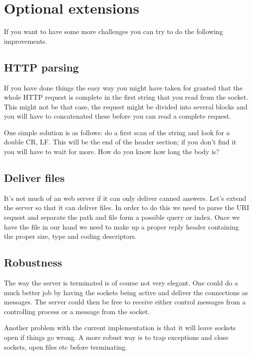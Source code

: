 \documentclass[a4paper,11pt]{article}
\begin{document}
\section{Optional extensions}

If you want to have some more challenges you can try to do the
following improvements.

\subsection{HTTP parsing}

If you have done things the easy way you might have taken for granted
that the whole HTTP request is complete in the first string that you
read from the socket. This might not be that case, the request might be
divided into several blocks and you will have to concatenated these
before you can read a complete request. 

One simple solution is as follows: do a first scan of the string and
look for a double CR, LF. This will be the end of the header section;
if you don't find it you will have to wait for more. How do you know
how long the body is?

\subsection{Deliver files}

It's not much of an web server if it can only deliver canned
answers. Let's extend the server so that it can deliver files. In
order to do this we need to parse the URI request and separate the
path and file form a possible query or index. Once we have the file in
our hand we need to make up a proper reply header containing the
proper size, type and coding descriptors.

\subsection{Robustness}

The way the server is terminated is of course not very elegant. One
could do a much better job by having the sockets being active and
deliver the connections as messages. The server could then be free to
receive either control messages from a controlling process or a message
from the socket. 

Another problem with the current implementation is that it will leave
sockets open if things go wrong. A more robust way is to trap
exceptions and close sockets, open files etc before terminating. 
\end{document}
